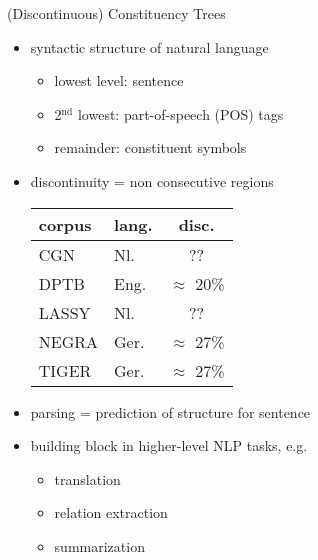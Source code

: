 \documentclass[slides]{subfiles}
\begin{document}
    \begin{frame}[label=working]{(Discontinuous) Constituency Trees}
        \begin{minipage}{.4\linewidth}
            \resizebox{\linewidth}{!}{
                }
        \end{minipage}
        \begin{minipage}{.58\linewidth}
            \begin{itemize}
                \item<+-> syntactic structure of natural language
                \begin{itemize}
                    \item<+-> lowest level: sentence
                    \item<+-> 2\(^\text{nd}\) lowest: part-of-speech (POS) tags
                    \item<+-> remainder: constituent symbols
                \end{itemize}
                \item<+-> discontinuity = non consecutive regions
                {\scriptsize\centering\begin{tabular}{llc}
                    \toprule
                    corpus & lang. & disc.\\%
                    \midrule
                    CGN \citep{hoekstra2001syntactic} & Nl.      & ?? \\
                    DPTB  \citep{EvaKal11} & Eng.      & $\approx$ 20\% \\
                    LASSY \citep{Noord09} & Nl.      & ?? \\
                    NEGRA \citep{Skut98}   & Ger.      & $\approx$ 27\% \\
                    TIGER \citep{Brants04} & Ger.      & $\approx$ 27\% \\
                    \bottomrule
                \end{tabular}}
                \item<+-> parsing = prediction of structure for sentence
                \item<+-> building block in higher-level NLP tasks, e.g.\@
                \begin{itemize}
                    \item translation \citep{Zhang19, Yang22}
                    \item relation extraction \citep{Nguyen19}
                    \item summarization \citep{Balachandran21}
                \end{itemize}
            \end{itemize}
        \end{minipage}
    \end{frame}
\end{document}
